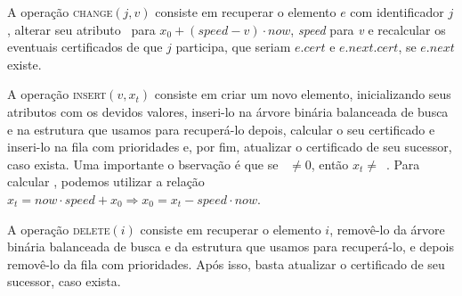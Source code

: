 



A operação \textsc{change}$(j, v)$ consiste em recuperar o
elemento $e$ com identificador $j$, alterar seu atributo
\initv~para $x_0 + (\mathit{speed} - v)\cdot now$,
\textit{speed} para \textit{v} e recalcular os eventuais
certificados de que $j$ participa, que seriam $e.cert$ e
$e.next.cert$, se $e.next$ existe.







A operação \textsc{insert}$(v, x_t)$ consiste em criar um novo
elemento, inicializando seus atributos com os devidos valores,
inseri-lo na árvore binária balanceada de busca e na estrutura
que usamos para recuperá-lo depois, calcular o seu certificado
e inseri-lo na fila com prioridades e, por fim, atualizar o
certificado de seu sucessor, caso exista. Uma importante o
bservação é que se \now~$\neq 0$, então $x_t \neq$~\initv.
Para calcular \initv, podemos utilizar a relação $x_t = now\cdot
speed + x_0 \Rightarrow x_0 = x_t - speed\cdot now$.





A operação \textsc{delete}$(i)$ consiste em recuperar o elemento
$i$, removê-lo da árvore binária balanceada de busca e da estrutura
que usamos para recuperá-lo, e depois removê-lo da fila com
prioridades. Após isso, basta atualizar o certificado de seu
sucessor, caso exista.


